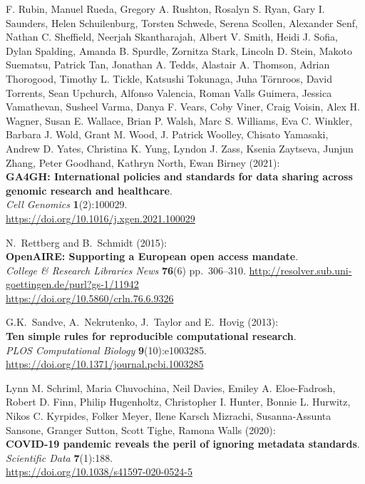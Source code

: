 \begin{thebibliography}{9}
F. Rubin, Manuel Rueda, Gregory A. Rushton, Rosalyn S. Ryan, Gary I.
Saunders, Helen Schuilenburg, Torsten Schwede, Serena Scollen, Alexander
Senf, Nathan C. Sheffield, Neerjah Skantharajah, Albert V. Smith, Heidi
J. Sofia, Dylan Spalding, Amanda B. Spurdle, Zornitza Stark, Lincoln D.
Stein, Makoto Suematsu, Patrick Tan, Jonathan A. Tedds, Alastair A.
Thomson, Adrian Thorogood, Timothy L. Tickle, Katsushi Tokunaga, Juha
Törnroos, David Torrents, Sean Upchurch, Alfonso Valencia, Roman Valls
Guimera, Jessica Vamathevan, Susheel Varma, Danya F. Vears, Coby Viner,
Craig Voisin, Alex H. Wagner, Susan E. Wallace, Brian P. Walsh, Marc S.
Williams, Eva C. Winkler, Barbara J. Wold, Grant M. Wood, J. Patrick
Woolley, Chisato Yamasaki, Andrew D. Yates, Christina K. Yung, Lyndon J.
Zass, Ksenia Zaytseva, Junjun Zhang, Peter Goodhand, Kathryn North, Ewan
Birney (2021):\\
\textbf{GA4GH: International policies and standards for data sharing
across genomic research and healthcare}.\\
\emph{Cell Genomics} \textbf{1}(2):100029.\\
\url{https://doi.org/10.1016/j.xgen.2021.100029}

N.~Rettberg and B.~Schmidt (2015):\\
\textbf{OpenAIRE: Supporting a European open access mandate}.\\
\emph{College \& Research Libraries News} \textbf{76}(6) pp.~306--310.
\url{http://resolver.sub.uni-goettingen.de/purl?gs-1/11942}\\
\url{https://doi.org/10.5860/crln.76.6.9326}

G.K.~Sandve, A.~Nekrutenko, J.~Taylor and E.~Hovig (2013):\\
\textbf{Ten simple rules for reproducible computational research}.\\
\emph{PLOS Computational Biology} \textbf{9}(10):e1003285.\\
\url{https://doi.org/10.1371/journal.pcbi.1003285}

Lynn M. Schriml, Maria Chuvochina, Neil Davies, Emiley A.
Eloe-Fadrosh, Robert D. Finn, Philip Hugenholtz, Christopher I. Hunter,
Bonnie L. Hurwitz, Nikos C. Kyrpides, Folker Meyer, Ilene Karsch
Mizrachi, Susanna-Assunta Sansone, Granger Sutton, Scott Tighe, Ramona
Walls (2020):\\
\textbf{COVID-19 pandemic reveals the peril of ignoring metadata
standards}.\\
\emph{Scientific Data} \textbf{7}(1):188.\\
\url{https://doi.org/10.1038/s41597-020-0524-5}


\end{thebibliography}
